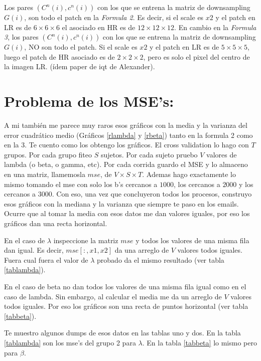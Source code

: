 \documentclass[a4paper,10pt]{article}
\begin{document}
Los pares $(C^n(i), c^n(i))$ con los que se entrena la matriz de downsampling $G(i)$, son todo el patch en la \textit{Formula 2}. 
Es decir, si el scale es $x2$ y el patch en LR es de $6\times6\times6$ el asociado en HR es de $12\times12\times12$. En cambio en la 
\textit{Formula 3}, los pares $(C^n(i), c^n(i))$ con los que se entrena la matriz de downsampling $G(i)$, NO son todo el patch. 
Si el scale es $x2$ y el patch en LR es de $5\times5\times5$, luego el patch de HR asociado es de $2\times2\times2$, pero es solo el 
pixel del centro de la imagen LR. (ídem paper de iqt de Alexander).



\section*{Problema de los MSE's:}
A mi también me parece muy raros esos gráficos con la media y la varianza del error cuadrático medio (Gráficos \ref{rlambda} y \ref{rbeta}) 
tanto en la formula 2 como en la 3. Te cuento como los obtengo los gráficos. 
El cross validation lo hago con $T$ grupos. Por cada grupo fiteo $S$ sujetos. 
Por cada sujeto pruebo $V$ valores de lambda (o beta, o gamma, etc). 
Por cada corrida guardo el MSE y lo almaceno en una matriz, llamemosla $mse$, de $V\times S\times T$.
Ademas hago exactamente lo mismo tomando el mse con solo los b's cercanos a $1000$, los cercanos 
a $2000$ y los cercanos a $3000$. Con eso, una vez que concluyeron todos los procesos, construyo 
esos gráficos con la mediana y la varianza que siempre te paso en los emails.
Ocurre que al tomar la media con esos datos me dan valores iguales, por eso los gráficos dan una recta horizontal.


En el caso de $\lambda$ inspeccione la matriz $mse$ y todos los valores de una misma fila dan igual. Es decir, $mse[:, x1, x2]$ da una arreglo
de $V$ valores todos iguales. Fuera cual fuera el valor de $\lambda$ probado da el mismo resultado (ver tabla \ref{tablambda}). 


En el caso de beta no dan todos los valores de una misma fila igual como en el caso de lambda. Sin embargo, al calcular el media me da un
arreglo de $V$ valores todos iguales. Por eso los gráficos son una recta de puntos horizontal (ver tabla \ref{tabbeta}).


Te muestro algunos dumps de esos datos en las tablas uno y dos. En la tabla \ref{tablambda} son los mse's del grupo 2 para $\lambda$. 
En la tabla \ref{tabbeta} lo mismo pero para $\beta$.
\end{document}
